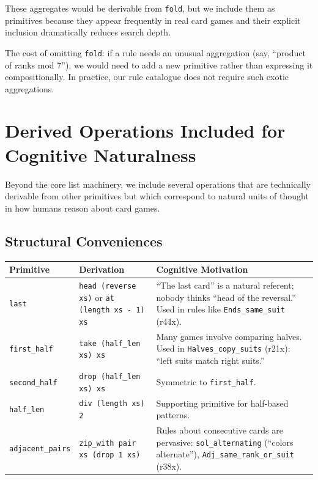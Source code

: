 \documentclass[11pt]{article}
\begin{document}
These aggregates would be derivable from \texttt{fold}, but we include them as primitives because they appear frequently in real card games and their explicit inclusion dramatically reduces search depth.

The cost of omitting \texttt{fold}: if a rule needs an unusual aggregation (say, ``product of ranks mod 7''), we would need to add a new primitive rather than expressing it compositionally. In practice, our rule catalogue does not require such exotic aggregations.

\section{Derived Operations Included for Cognitive Naturalness}

Beyond the core list machinery, we include several operations that are technically derivable from other primitives but which correspond to natural units of thought in how humans reason about card games.

\subsection{Structural Conveniences}

\begin{center}
\begin{tabular}{lp{5cm}p{6cm}}
\toprule
\textbf{Primitive} & \textbf{Derivation} & \textbf{Cognitive Motivation} \\
\midrule
\texttt{last} & \texttt{head (reverse xs)} or \texttt{at (length xs - 1) xs} & ``The last card'' is a natural referent; nobody thinks ``head of the reversal.'' Used in rules like \texttt{Ends\_same\_suit} (r44x). \\
\texttt{first\_half} & \texttt{take (half\_len xs) xs} & Many games involve comparing halves. Used in \texttt{Halves\_copy\_suits} (r21x): ``left suits match right suits.'' \\
\texttt{second\_half} & \texttt{drop (half\_len xs) xs} & Symmetric to \texttt{first\_half}. \\
\texttt{half\_len} & \texttt{div (length xs) 2} & Supporting primitive for half-based patterns. \\
\texttt{adjacent\_pairs} & \texttt{zip\_with pair xs (drop 1 xs)} & Rules about consecutive cards are pervasive: \texttt{sol\_alternating} (``colors alternate''), \texttt{Adj\_same\_rank\_or\_suit} (r38x). \\
\bottomrule
\end{tabular}
\end{center}
\end{document}
